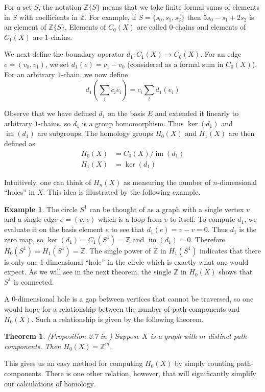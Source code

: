 \documentclass[12pt,a4paper]{amsart}
\numberwithin{equation}{section}
\def\Z{{\mathbb Z}}
\def\im{\operatorname{im}}
\def\ker{\operatorname{ker}}
\theoremstyle{plain}
\newtheorem{Th}{Theorem}
\theoremstyle{definition}
\newtheorem{Ex}{Example}
\begin{document}
For a set $S$, the notation $\Z\{S\}$ means that we take finite formal sums of elements in $S$ with coefficients in $\Z$. For example, if $S=\{s_0, s_1, s_2\}$ then $5s_0 - s_1 + 2s_2$ is an element of $\Z\{S\}$.  Elements of $C_0(X)$ are called $0$-chains and elements of $C_1(X)$ are $1$-chains.

We next define the boundary operator $d_1 : C_1(X) \to C_0(X)$. For an edge $e=(v_0,v_1)$, we set $d_1(e) = v_1-v_0$ (considered as a formal sum in $C_0(X)$). For an arbitrary $1$-chain, we now define
\[ d_1\left( \sum_i c_i e_i \right) = c_i \sum_i d_1(e_i) \]

Observe that we have defined $d_1$ on the basis $E$ and extended it linearly to arbitrary $1$-chains, so $d_1$ is a group homomorphism. Thus $\ker(d_1)$ and $\im(d_1)$ are subgroups. The homology groups $H_0(X)$ and $H_1(X)$ are then defined as
\begin{align*}
H_0(X) &= C_0(X) / \im(d_1) \\
H_1(X) &= \ker(d_1)
\end{align*}

Intuitively, one can think of $H_n(X)$ as measuring the number of $n$-dimensional ``holes'' in $X$. This idea is illustrated by the following example.

\begin{Ex} 
The circle $S^1$ can be thought of as a graph with a single vertex $v$ and a single edge $e = (v,v)$ which is a loop from $v$ to itself. To compute $d_1$, we evaluate it on the basis element $e$ to see that $d_1(e) = v-v = 0$. Thus $d_1$ is the zero map, so $\ker(d_1) = C_1(S^1) = \Z$ and $\im(d_1) = 0$. Therefore $H_0(S^1) = H_1(S^1) = \Z$. The single power of $\Z$ in $H_1(S^1)$ indicates that there is only one 1-dimensional ``hole'' in the circle which is exactly what one would expect. As we will see in the next theorem, the single $\Z$ in $H_0(X)$ shows that $S^1$ is connected.
\end{Ex}

A 0-dimensional hole is a gap between vertices that cannot be traversed, so one would hope for a relationship between the number of path-components and $H_0(X)$. Such a relationship is given by the following theorem.

\begin{Th}
(Proposition 2.7 in \cite{hatcher}) 
Suppose $X$ is a graph with $m$ distinct path-components. Then $H_0(X) = \Z^m$.
\end{Th}

This gives us an easy method for computing $H_0(X)$ by simply counting path-components. There is one other relation, however, that will significantly simplify our calculations of homology.
\end{document}
